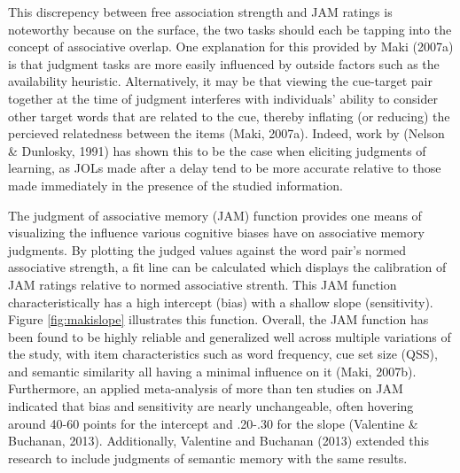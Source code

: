 \documentclass[english,,man]{apa6}
\begin{document}
This discrepency between free association strength and JAM ratings is
noteworthy because on the surface, the two tasks should each be tapping
into the concept of associative overlap. One explanation for this
provided by Maki (2007a) is that judgment tasks are more easily
influenced by outside factors such as the availability heuristic.
Alternatively, it may be that viewing the cue-target pair together at
the time of judgment interferes with individuals' ability to consider
other target words that are related to the cue, thereby inflating (or
reducing) the percieved relatedness between the items (Maki, 2007a).
Indeed, work by (Nelson \& Dunlosky, 1991) has shown this to be the case
when eliciting judgments of learning, as JOLs made after a delay tend to
be more accurate relative to those made immediately in the presence of
the studied information.

The judgment of associative memory (JAM) function provides one means of
visualizing the influence various cognitive biases have on associative
memory judgments. By plotting the judged values against the word pair's
normed associative strength, a fit line can be calculated which displays
the calibration of JAM ratings relative to normed associative strenth.
This JAM function characteristically has a high intercept (bias) with a
shallow slope (sensitivity). Figure \ref{fig:makislope} illustrates this
function. Overall, the JAM function has been found to be highly reliable
and generalized well across multiple variations of the study, with item
characteristics such as word frequency, cue set size (QSS), and semantic
similarity all having a minimal influence on it (Maki, 2007b).
Furthermore, an applied meta-analysis of more than ten studies on JAM
indicated that bias and sensitivity are nearly unchangeable, often
hovering around 40-60 points for the intercept and .20-.30 for the slope
(Valentine \& Buchanan, 2013). Additionally, Valentine and Buchanan
(2013) extended this research to include judgments of semantic memory
with the same results.
\end{document}
